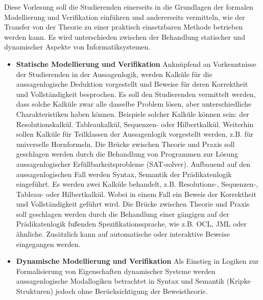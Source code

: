 \begin{course}
\begin{content}
Diese Vorlesung soll die Studierenden einerseits in die Grundlagen der formalen Modellierung und Verifikation einführen und andererseits vermitteln, wie der Transfer von der Theorie zu einer praktisch einsetzbaren Methode betrieben werden kann.\newline
Es wird unterschieden zwischen der Behandlung statischer und dynamischer Aspekte von Informatiksystemen.

 \begin{itemize}\item \textbf{Statische Modellierung und Verifikation}\newline
Anknüpfend an Vorkenntnisse der Studierenden in der Aussagenlogik, werden Kalküle für die aussagenlogische Deduktion vorgestellt und Beweise für deren Korrektheit und Vollständigkeit besprochen. Es soll den Studierenden vermittelt werden, dass solche Kalküle zwar alle dasselbe Problem lösen, aber unterschiedliche Charakteristiken haben können. Beispiele solcher Kalküle können sein: der Resolutionskalkül. Tableaukalkül, Sequenzen- oder Hilbertkalkül. Weiterhin sollen Kalküle für Teilklassen der Aussagenlogik vorgestellt werden, z.B. für universelle Hornformeln.\newline
Die Brücke zwischen Theorie und Praxis soll geschlagen werden durch die Behandlung von Programmen zur Lösung aussagenlogischer Erfüllbarkeitsprobleme (SAT-solver).\newline
\newline
Aufbauend auf den aussagenlogischen Fall werden Syntax, Semantik der Prädikatenlogik eingeführt. Es werden zwei Kalküle behandelt, z.B. Resolutions-, Sequenzen-, Tableau- oder Hilbertkalkül. Wobei in einem Fall ein Beweis der Korrektheit und Vollständigkeit geführt wird.\newline
Die Brücke zwischen Theorie und Praxis soll geschlagen werden durch die Behandlung einer gängigen auf der Prädikatenlogik fußenden Spezifikationssprache, wie z.B. OCL, JML oder ähnliche. Zusätzlich kann auf automatische oder interaktive Beweise eingegangen werden.  \end{itemize}\begin{itemize}\item \textbf{Dynamische Modellierung und Verifikation}\newline
Als Einstieg in Logiken zur Formalisierung von Eigenschaften dynamischer Systeme werden aussagenlogische Modallogiken betrachtet in Syntax und Semantik (Kripke Strukturen) jedoch ohne Berücksichtigung der Beweistheorie.\newline

\end{itemize}
\end{content}
\end{course}
